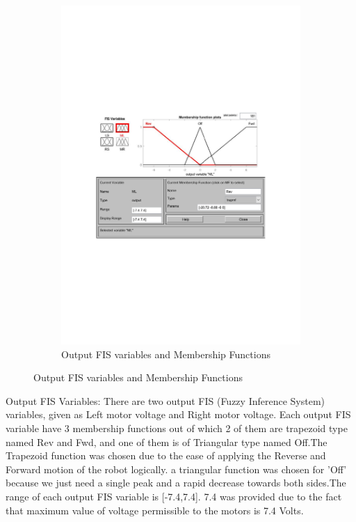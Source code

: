 \documentclass{l4proj}
\begin{document}
\begin{figure}[htb]
\begin{subfigure}{0.45\textwidth}
        \includegraphics[width=\textwidth]{images/output fis.pdf}
        \caption{Output FIS variables and Membership Functions}
        \label{fig:syn2}
    \end{subfigure} 
\end{figure}
\newpage
Output FIS Variables: There are two output FIS (Fuzzy Inference System) variables, given as Left motor voltage and Right motor voltage. Each output FIS variable have 3 membership functions out of which 2 of them  are trapezoid type named Rev and Fwd, and one of them is of Triangular type named Off.The Trapezoid function was chosen due to the ease of applying the Reverse and Forward motion of the robot logically. a triangular function was chosen for 'Off' because we just need a single peak and a rapid decrease towards both sides.The range of each output FIS variable is [-7.4,7.4]. 7.4 was provided due to the fact that maximum value of voltage permissible to the motors is 7.4 Volts.
\end{document}
